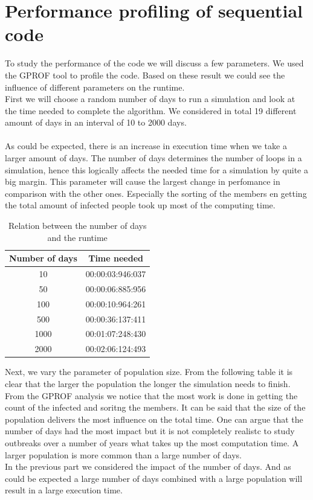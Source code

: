 \documentclass[runningheads]{llncs}
\begin{document}
	\section{Performance profiling of sequential code}
	To study the performance of the code we will discuss a few parameters. We used the GPROF tool to profile the code. Based on these result we could see the influence of different parameters on the runtime.
	\\
	First we will choose a random number of days to run a simulation and look at the time needed to complete the algorithm. We considered in total 19 different amount of days in an interval of 10 to 2000 days. \\ 
	\\
	As could be expected, there is an increase in execution time when we take a larger amount of days. The number of days determines the number of loops in a simulation, hence this logically affects the needed time for a simulation by quite a big margin. This parameter will cause the largest change in perfomance in comparison with the other ones. Especially the sorting of the members en getting the total amount of infected people took up most of the computing time.
	
	\begin{table}
		\caption{Relation between the number of days and the runtime}
		\begin{center}
			\begin{tabular}{ | c | c |}
				\hline
				Number of days & Time needed \\ \hline
				10 & 00:00:03:946:037 \\ \hline
				50 & 00:00:06:885:956 \\ \hline
				100 & 00:00:10:964:261 \\ \hline
				500 & 00:00:36:137:411 \\ \hline
				1000 & 00:01:07:248:430 \\ \hline
				2000 & 00:02:06:124:493 \\
				\hline	
			\end{tabular}
		\end{center}
	\end{table}
	
	\noindent
	Next, we vary the parameter of population size. From the following table it is clear that the larger the population the longer the simulation needs to finish. From the GPROF analysis we notice that the most work is done in getting the count of the infected and soritng the members. It can be said that the size of the population delivers the most influence on the total time. One can argue that the number of days had the most impact but it is not completely realistc to study outbreaks over a number of years what takes up the most computation time. A larger population is more common than a large number of days.
	\\
	In the previous part we considered the impact of the number of days. And as could be expected a large number of days combined with a large population will result in a large execution time.
	
\end{document}
